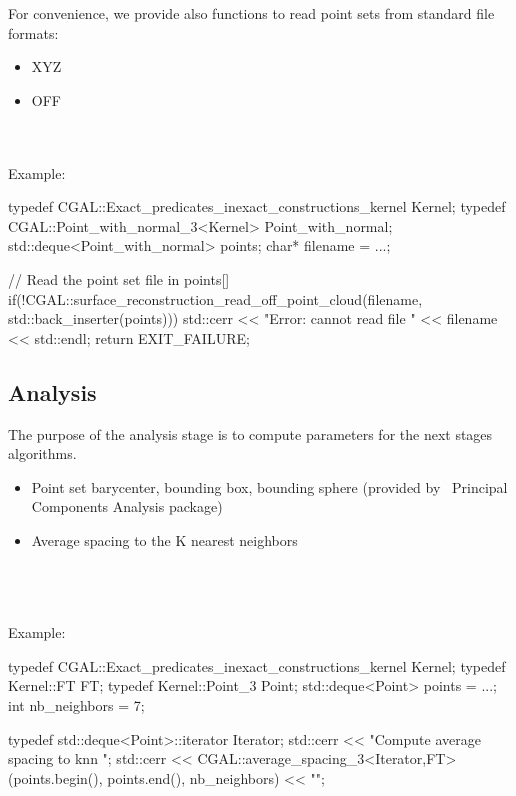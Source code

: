 For convenience, we provide also functions to read point sets from standard file formats:

\begin{itemize}
\item XYZ
\item OFF
\end{itemize}

  \\
  \\

Example:

\begin{ccExampleCode}
typedef CGAL::Exact_predicates_inexact_constructions_kernel Kernel;
typedef CGAL::Point_with_normal_3<Kernel> Point_with_normal;
std::deque<Point_with_normal> points;
char* filename = ...;

// Read the point set file in points[]
if(!CGAL::surface_reconstruction_read_off_point_cloud(filename,
                                                      std::back_inserter(points)))
{
  std::cerr << "Error: cannot read file " << filename << std::endl;
  return EXIT_FAILURE;
}
\end{ccExampleCode}


\subsection{Analysis}

The purpose of the analysis stage is to compute parameters for the next stages algorithms.

\begin{itemize}
\item Point set barycenter, bounding box, bounding sphere (provided by \cgal\ Principal Components Analysis package)
\item Average spacing to the K nearest neighbors
\end{itemize}

  \\
  \\
  \\

Example:

\begin{ccExampleCode}
typedef CGAL::Exact_predicates_inexact_constructions_kernel Kernel;
typedef Kernel::FT FT;
typedef Kernel::Point_3 Point;
std::deque<Point> points = ...;
int nb_neighbors = 7;

typedef std::deque<Point>::iterator Iterator;
std::cerr << "Compute average spacing to knn ";
std::cerr << CGAL::average_spacing_3<Iterator,FT>(points.begin(), points.end(),
                                                  nb_neighbors) << "\n";
\end{ccExampleCode}


